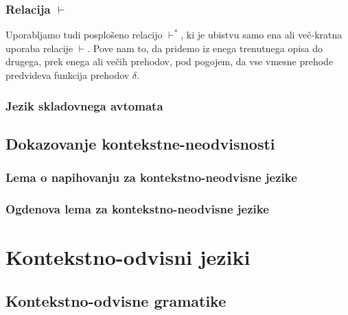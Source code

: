 \documentclass[10pt,a4paper,oneside]{book}
\begin{document}
\subsection{Relacija $\vdash$}
Uporabljamo tudi posplošeno relacijo $\vdash^*$, ki je ubistvu samo ena ali več-kratna uporaba relacije $\vdash$. Pove nam to, da pridemo iz enega trenutnega opisa do drugega, prek enega ali večih prehodov, pod pogojem, da vse vmesne prehode predvideva funkcija prehodov $\delta$.

\subsection{Jezik skladovnega avtomata}

\section{Dokazovanje kontekstne-neodvisnosti}\label{sec:Dokazovanje KNJ}
\subsection{Lema o napihovanju za kontekstno-neodvisne jezike}
\subsection{Ogdenova lema za kontekstno-neodvisne jezike}

\chapter{Kontekstno-odvisni jeziki}\label{chap:Kontekstno-odvisni jeziki}
\section{Kontekstno-odvisne gramatike}
\end{document}
